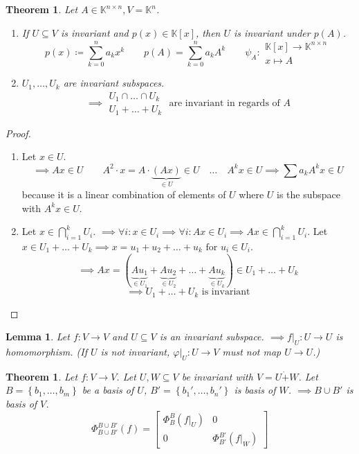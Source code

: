 \documentclass{article}
\newcounter{lecref}[section]
\numberwithin{lecref}{section}
\newtheorem{theorem}[lecref]{Theorem}
\newtheorem{lemma}[lecref]{Lemma}
\newcommand{\set}[1]{\left\{#1\right\}}
\begin{document}
\begin{theorem} %
  \label{s113}
  Let $A \in \mathbb K^{n\times n}, V = \mathbb K^n$.
  \begin{enumerate}
    \item If $U \subseteq V$ is invariant and $p(x) \in \mathbb K[x]$, then $U$ is invariant under $p(A)$.
      \[
        p(x) \coloneqq \sum_{k=0}^n a_k x^k 
        \qquad p(A) = \sum_{k=0}^n a_k A^k
        \qquad \psi_A: \substack{\mathbb K[x] \to \mathbb K^{n\times n} \\ x \mapsto A}
      \]
    \item $U_1, \dots, U_k$ are invariant subspaces.
      \[ \implies \substack{U_1 \cap \dots \cap U_k \\ U_1 + \dots + U_k} \text{ are invariant in regards of } A \]
  \end{enumerate}
\end{theorem}

\begin{proof}
  \begin{enumerate}
    \item Let $x \in U$.
      \[ \implies Ax \in U \qquad A^2 \cdot x = A \cdot \underbrace{(Ax)}_{\in U} \in U \quad \dots \quad A^k x \in U \implies \sum a_k A^k x \in U \]
      because it is a linear combination of elements of $U$ where $U$ is the subspace with $A^k x \in U$.
    \item Let $x \in \bigcap_{i=1}^k U_i$. $\implies \forall i: x \in U_i \implies \forall i: Ax \in U_i \implies Ax \in \bigcap_{i=1}^k U_i$.
      Let $x \in U_1 + \dots + U_k \implies x = u_1 + u_2 + \dots + u_k \text{ for } u_i \in U_i$.
      \[ \implies Ax = (\underbrace{Au_1}_{\in U_1} + \underbrace{Au_2}_{\in U_2} + \dots + \underbrace{Au_k}_{\in U_k}) \in U_1 + \dots + U_k \]
      \[ \implies U_1 + \dots + U_k \text{ is invariant} \]
  \end{enumerate}
\end{proof}

\begin{lemma} %
  Let $f: V \to V$ and $U \subseteq V$ is an invariant subspace.
  $\implies f|_U: U \to U$ is homomorphism.
  (If $U$ is not invariant, $\varphi|_U: U \to V$ must not map $U \to U$.)
\end{lemma}

\begin{theorem} %
  Let $f: V \to V$. Let $U, W \subseteq V$ be invariant with $V = U \dot+ W$.
  Let $B = \set{b_1, \dots, b_m}$ be a basis of $U$, $B' = \set{b_1', \dots, b_n'}$ is basis of $W$.
  $\implies B \cup B'$ is basis of $V$.
  \[
    \Phi_{B\cup B'}^{B\cup B'}(f) = \left[\begin{array}{c|c}
      \Phi_B^B(f|_U) & 0 \\
    \hline
      0 & \Phi_{B'}^{B'}(f|_W)
    \end{array}\right]
  \]
\end{theorem}
\end{document}
